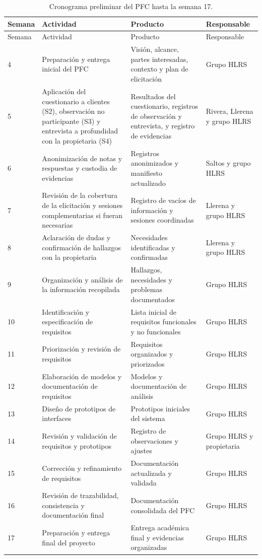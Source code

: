 \documentclass[11pt,a4paper]{article}
\begin{document}
	{\small
		\begin{xltabular}{\textwidth}{@{}lYYY@{}}
			\caption{Cronograma preliminar del PFC hasta la semana 17.}\label{tab:cronograma}\\
			\toprule
			Semana & Actividad & Producto & Responsable \\
			\midrule
			\endfirsthead
			\toprule
			Semana & Actividad & Producto & Responsable \\
			\midrule
			\endhead
			\bottomrule
			\endfoot
			
			4 & Preparación y entrega inicial del PFC & Visión, alcance, partes interesadas, contexto y plan de elicitación & Grupo HLRS \\
			5 & Aplicación del cuestionario a clientes (S2), observación no participante (S3) y entrevista a profundidad con la propietaria (S4) & Resultados del cuestionario, registros de observación y entrevista, y registro de evidencias & Rivera, Llerena y grupo HLRS \\
			6 & Anonimización de notas y respuestas y custodia de evidencias & Registros anonimizados y manifiesto actualizado & Saltos y grupo HLRS \\
			7 & Revisión de la cobertura de la elicitación y sesiones complementarias si fueran necesarias & Registro de vacíos de información y sesiones coordinadas & Llerena y grupo HLRS \\
			8 & Aclaración de dudas y confirmación de hallazgos con la propietaria & Necesidades identificadas y confirmadas & Llerena y grupo HLRS \\
			9 & Organización y análisis de la información recopilada & Hallazgos, necesidades y problemas documentados & Grupo HLRS \\
			10 & Identificación y especificación de requisitos & Lista inicial de requisitos funcionales y no funcionales & Grupo HLRS \\
			11 & Priorización y revisión de requisitos & Requisitos organizados y priorizados & Grupo HLRS \\
			12 & Elaboración de modelos y documentación de requisitos & Modelos y documentación de análisis & Grupo HLRS \\
			13 & Diseño de prototipos de interfaces & Prototipos iniciales del sistema & Grupo HLRS \\
			14 & Revisión y validación de requisitos y prototipos & Registro de observaciones y ajustes & Grupo HLRS y propietaria \\
			15 & Corrección y refinamiento de requisitos & Documentación actualizada y validada & Grupo HLRS \\
			16 & Revisión de trazabilidad, consistencia y documentación final & Documentación consolidada del PFC & Grupo HLRS \\
			17 & Preparación y entrega final del proyecto & Entrega académica final y evidencias organizadas & Grupo HLRS \\
		\end{xltabular}
	}
	
\end{document}
